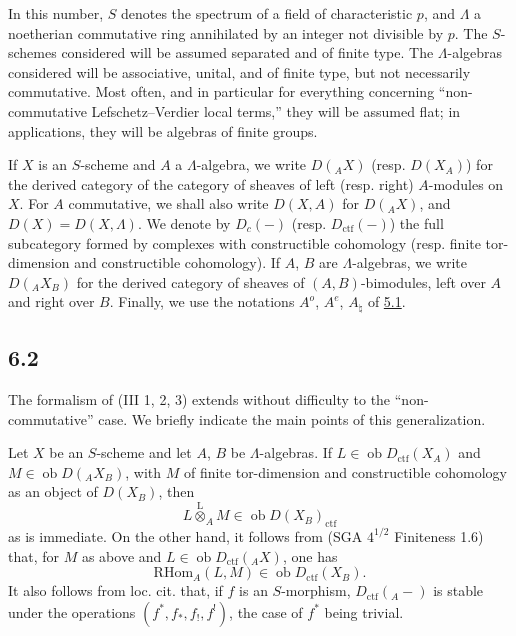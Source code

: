 \documentclass[11pt]{article}
\providecommand{\RHom}{\mathrm{RHom}}
\providecommand{\lten}{\overset{\mathrm L}{\otimes}}
\providecommand{\Ob}{\operatorname{ob}}
\providecommand{\RHom}{\mathrm{RHom}}
\providecommand{\lten}{\overset{\mathrm L}{\otimes}}
\providecommand{\RHom}{\mathrm R\mathcal{H}om}
\providecommand{\lten}{\overset{\mathrm L}{\otimes}}
\providecommand{\Ob}{\operatorname{ob}}
\providecommand{\lten}{\overset{\mathrm L}{\otimes}}
\providecommand{\lten}{\overset{\mathrm L}{\otimes}}
\providecommand{\Ob}{\operatorname{Ob}}
\providecommand{\lten}{\overset{\mathrm L}{\otimes}}
\providecommand{\RHom}{\mathrm{RHom}}
\providecommand{\Ob}{\operatorname{ob}}
\providecommand{\Ob}{\operatorname{Ob}}
\providecommand{\lten}{\overset{\mathrm L}{\otimes}}
\begin{document}
In this number, $S$ denotes the spectrum of a field of characteristic $p$, and $\Lambda$ a noetherian commutative ring annihilated by an integer not divisible by $p$. The $S$-schemes considered will be assumed separated and of finite type. The $\Lambda$-algebras considered will be associative, unital, and of finite type, but not necessarily commutative. Most often, and in particular for everything concerning “non-commutative Lefschetz--Verdier local terms,” they will be assumed flat; in applications, they will be algebras of finite groups.

If $X$ is an $S$-scheme and $A$ a $\Lambda$-algebra, we write $D({}_AX)$ (resp. $D(X_A)$) for the derived category of the category of sheaves of left (resp. right) $A$-modules on $X$. For $A$ commutative, we shall also write $D(X,A)$ for $D({}_AX)$, and $D(X)=D(X,\Lambda)$. We denote by $D_c(-)$ (resp. $D_{\mathrm{ctf}}(-)$) the full subcategory formed by complexes with constructible cohomology (resp. finite tor-dimension and constructible cohomology). If $A$, $B$ are $\Lambda$-algebras, we write $D({}_AX_B)$ for the derived category of sheaves of $(A,B)$-bimodules, left over $A$ and right over $B$. Finally, we use the notations $A^o$, $A^e$, $A_{\natural}$ of \hyperref[sga5:IIIB:subsubsection:5.1]{5.1}.

\subsection*{6.2}\label{sga5:IIIB:subsection:6.2}
The formalism of (III 1, 2, 3) extends without difficulty to the “non-commutative” case. We briefly indicate the main points of this generalization.

Let $X$ be an $S$-scheme and let $A$, $B$ be $\Lambda$-algebras. If $L\in\Ob D_{\mathrm{ctf}}(X_A)$ and $M\in\Ob D({}_AX_B)$, with $M$ of finite tor-dimension and constructible cohomology as an object of $D(X_B)$, then
\[
L\lten_A M\in\Ob D(X_B)_{\mathrm{ctf}}
\]
as is immediate. On the other hand, it follows from (SGA $4^{1/2}$ Finiteness 1.6) that, for $M$ as above and $L\in\Ob D_{\mathrm{ctf}}({}_AX)$, one has
\[
\RHom_A(L,M)\in\Ob D_{\mathrm{ctf}}(X_B).
\]
It also follows from loc. cit. that, if $f$ is an $S$-morphism, $D_{\mathrm{ctf}}({}_A-)$ is stable under the operations $(f^*,f_*,f_!,f^!)$, the case of $f^*$ being trivial.
\end{document}
